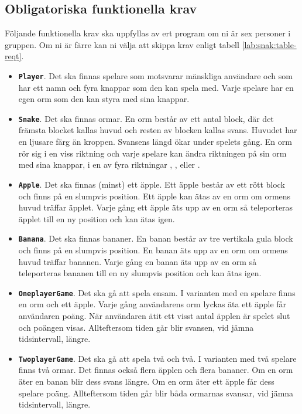 \subsection{Obligatoriska funktionella krav}

Följande funktionella krav ska uppfyllas av ert program om ni är sex personer i gruppen. Om ni är färre kan ni välja att skippa krav enligt tabell \ref{lab:snak:table-reqt}.
\begin{itemize}[nosep, label={$\square$},]
\item \textbf{\texttt{Player}}. Det ska finnas spelare som motsvarar mänskliga användare och som har ett namn och fyra knappar som den kan spela med. Varje spelare har en egen orm som den kan styra med sina knappar.

\item \textbf{\texttt{Snake}}. Det ska finnas ormar. En orm består av ett antal block, där det främsta blocket kallas huvud och resten av blocken kallas svans. Huvudet har en ljusare färg än kroppen. Svansens längd ökar under spelets gång. En orm rör sig i en viss riktning och varje spelare kan ändra riktningen på sin orm med sina knappar, i en av fyra riktningar , ,  eller .

\item \textbf{\texttt{Apple}}. Det ska finnas (minst) ett äpple. Ett äpple består av ett rött block och finns på en slumpvis position. Ett äpple kan ätas av en orm om ormens huvud träffar äpplet. Varje gång ett äpple äts upp av en orm så teleporteras äpplet till en ny position och kan ätas igen.

\item \textbf{\texttt{Banana}}. Det ska finnas bananer. En banan består av tre vertikala gula block och finns på en slumpvis position. En banan äts upp av en orm om ormens huvud träffar bananen. Varje gång en banan äts upp av en orm så teleporteras bananen till en ny slumpvis position och kan ätas igen.

\item \textbf{\texttt{OneplayerGame}}. Det ska gå att spela ensam. I varianten med en spelare finns en orm och ett äpple. Varje gång användarens orm lyckas äta ett äpple får användaren poäng. När användaren ätit ett visst antal äpplen är spelet slut och poängen visas. Allteftersom tiden går blir svansen, vid jämna tidsintervall, längre.

\item \textbf{\texttt{TwoplayerGame}}. Det ska gå att spela två och två. I varianten med två spelare finns två ormar. Det finnas också flera äpplen och flera bananer. Om en orm äter en banan blir dess svans längre. Om en orm äter ett äpple får dess spelare poäng. Allteftersom tiden går blir båda ormarnas svansar, vid jämna tidsintervall, längre.

\end{itemize}
